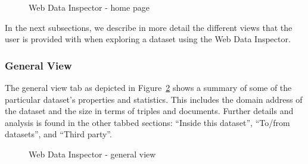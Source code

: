 \begin{figure}
	\centering
	\caption{Web Data Inspector - home page}
	\label{fig:wdi:home-page}
\end{figure}

In the next subsections, we describe in more detail the different views that the user is provided with when exploring a dataset using the Web Data Inspector. 

\subsubsection{General View}

The general view tab as depicted in Figure~\ref{fig:wdi:generalView} shows a summary of some of the particular dataset's properties and statistics. This includes the domain address of the dataset and the size in terms of triples and documents. Further details and analysis is found in the other tabbed sections: ``Inside this dataset'', ``To/from datasets'', and ``Third party''.

\begin{figure}
	\centering
	\caption{Web Data Inspector - general view}
	\label{fig:wdi:generalView}
\end{figure}

